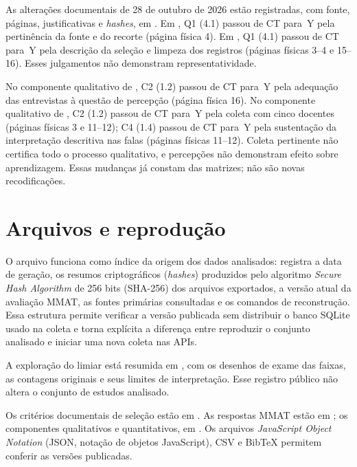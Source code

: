 \begin{apendicesenv}
As alterações documentais de 28 de outubro de 2026 estão registradas, com fonte, páginas, justificativas e \textit{hashes}, em . Em , Q1 (4.1) passou de CT para~Y pela pertinência da fonte e do recorte (página física 4). Em , Q1 (4.1) passou de CT para~Y pela descrição da seleção e limpeza dos registros (páginas físicas 3--4 e 15--16). Esses julgamentos não demonstram representatividade.

\begingroup{}
No componente qualitativo de , C2 (1.2) passou de CT para~Y pela adequação das entrevistas à questão de percepção (página física 16). No componente qualitativo de , C2 (1.2) passou de CT para~Y pela coleta com cinco docentes (páginas físicas 3 e 11--12); C4 (1.4) passou de CT para~Y pela sustentação da interpretação descritiva nas falas (páginas físicas 11--12). Coleta pertinente não certifica todo o processo qualitativo, e percepções não demonstram efeito sobre aprendizagem. Essas mudanças já constam das matrizes; não são novas recodificações.
\par\endgroup

\section{Arquivos e reprodução}

O arquivo  funciona como índice da origem dos dados analisados: registra a data de geração, os resumos criptográficos (\textit{hashes}) produzidos pelo algoritmo \textit{Secure Hash Algorithm} de 256 bits (SHA-256) dos arquivos exportados, a versão atual da avaliação MMAT, as fontes primárias consultadas e os comandos de reconstrução. Essa estrutura permite verificar a versão publicada sem distribuir o banco SQLite usado na coleta e torna explícita a diferença entre reproduzir o conjunto analisado e iniciar uma nova coleta nas APIs.

A exploração do limiar está resumida em , com os desenhos de exame das faixas, as contagens originais e seus limites de interpretação. Esse registro público não altera o conjunto de estudos analisado.

Os critérios documentais de seleção estão em . As respostas MMAT estão em ; os componentes qualitativos e quantitativos, em . Os arquivos \textit{JavaScript Object Notation} (JSON, notação de objetos JavaScript), CSV e BibTeX permitem conferir as versões publicadas.


\end{apendicesenv}
